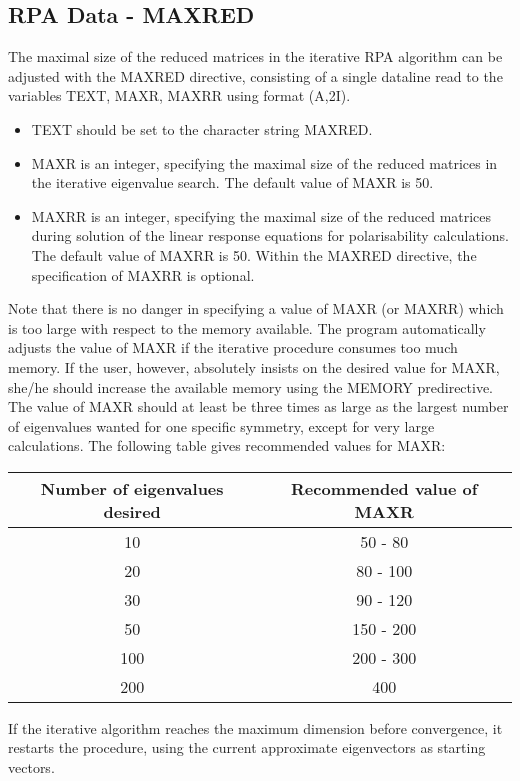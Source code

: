 \documentclass[11pt,fleqn]{article}
\begin{document}
\subsection{RPA Data - MAXRED}
The maximal size of the reduced matrices in the iterative RPA algorithm
can be adjusted with the MAXRED directive, consisting of a single dataline
read to the variables TEXT, MAXR, MAXRR using format (A,2I).
\begin{itemize}
\item TEXT should be set to the character string MAXRED.
\item MAXR is an integer, specifying the maximal size of the reduced matrices
      in the iterative eigenvalue search. The default value of MAXR is 50.
\item MAXRR is an integer, specifying the maximal size of the reduced matrices
      during solution of the linear response equations for polarisability
      calculations. The default value of MAXRR is 50. Within the MAXRED
      directive, the specification of MAXRR is optional.
\end{itemize}
Note that there is no danger in specifying a value of MAXR (or MAXRR) which
is too large with respect to the memory available. The program automatically
adjusts the value of MAXR if the iterative procedure consumes too much
memory. If the user, however, absolutely insists on the desired value 
for MAXR, she/he
should increase the available memory using the MEMORY predirective.
The value of MAXR should at least be three times as large
as the largest number of eigenvalues wanted for one specific symmetry,
except for very large calculations. The following table gives recommended
values for MAXR:
\begin{center}
\begin{tabular}{|c|c|}
Number of eigenvalues desired & Recommended value of MAXR \\ \hline
10         &  50 - 80    \\
20         &  80 - 100    \\
30         &  90 - 120    \\
50         &  150 - 200    \\
100        &  200 - 300    \\
200        &  400                                         \\ \hline
\end{tabular}
\end{center}
If the iterative algorithm reaches the maximum dimension before convergence,
it restarts the procedure, using the current approximate eigenvectors
as starting vectors.
%
\end{document}
